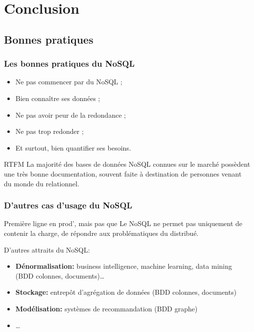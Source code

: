 \section{Conclusion}

	\subsection{Bonnes pratiques}
		\begin{frame}
			\frametitle{Les bonnes pratiques du NoSQL}

			\begin{itemize}
				\item Ne pas commencer par du NoSQL ;
				\item Bien connaître ses données ;
				\item Ne pas avoir peur de la redondance ;
				\item Ne pas trop redonder ;
				\item Et surtout, bien quantifier ses besoins.
			\end{itemize}


			\begin{block}{RTFM}
				La majorité des bases de données NoSQL connues sur le marché possèdent une très bonne documentation, souvent faite à destination de personnes venant du monde du relationnel.
			\end{block}
		\end{frame}

		\begin{frame}
			\frametitle{D'autres cas d'usage du NoSQL}
			\begin{alertblock}{Première ligne en prod', mais pas que}
				Le NoSQL ne permet pas uniquement de contenir la charge, de répondre aux problématiques du distribué.
			\end{alertblock}

			\vspace{10px}

			D'autres attraits du NoSQL:
			\begin{itemize}
				\item \textbf{Dénormalisation:} business intelligence, machine learning, data mining (BDD colonnes, documents)\dots
				\item \textbf{Stockage:} entrepôt d’agrégation de données (BDD colonnes, documents)
				\item \textbf{Modélisation:} systèmes de recommandation (BDD graphe)
				\item \dots
			\end{itemize}
		\end{frame}

